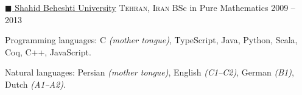\documentclass[10pt,a4paper]{article}
\newcommand{\colorsquare}[1]{\textcolor{#1}{$\blacksquare$}}
\begin{document}
\headedsection
  {\href{http://en.sbu.ac.ir/}{\colorsquare{brickred} Shahid Beheshti University}}
  {\textsc{Tehran, Iran}} {%
  \headedsubsection
    {BSc in Pure Mathematics}
    {2009 -- 2013} 
    {
    }
}



\spacedhrule{0.5em}{-0.4em}


\inlineheadsection  %
  {Programming languages:}
  {C \emph{(mother tongue)}, TypeScript, Java, Python, Scala, Coq, C++, JavaScript.}

\vspace{0.5em}
\inlineheadsection
  {Natural languages:}
  {Persian \emph{(mother tongue)}, English \emph{(C1--C2)}, German \emph{(B1)}, Dutch \emph{(A1--A2)}.
  }

\end{document}
